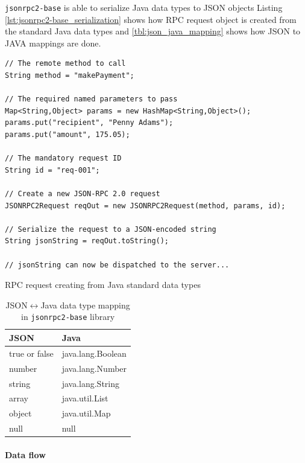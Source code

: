 \texttt{jsonrpc2-base} is able to serialize Java data types to JSON objects
Listing \ref{lst:jsonrpc2-base_serialization} shows how RPC request object is
created from the standard Java data types and \autoref{tbl:json_java_mapping}
shows how JSON to JAVA mappings are done.

\begin{listing}[H]
\begin{verbatim}
// The remote method to call
String method = "makePayment";

// The required named parameters to pass
Map<String,Object> params = new HashMap<String,Object>();
params.put("recipient", "Penny Adams");
params.put("amount", 175.05);

// The mandatory request ID
String id = "req-001";

// Create a new JSON-RPC 2.0 request
JSONRPC2Request reqOut = new JSONRPC2Request(method, params, id);

// Serialize the request to a JSON-encoded string
String jsonString = reqOut.toString();

// jsonString can now be dispatched to the server...
\end{verbatim}
\caption{RPC request creating from Java standard data types \cite{jsonrpc2-base}}
\label{lst:jsonrpc2-base_serialization}
\end{listing}


\begin{table}[h]
	\centering	
	\begin{tabularx}{0.5\textwidth}{|X|X|}
		\hline
		\textbf{JSON} & \textbf{Java} 	 	\\ \hline	    
		true or false & java.lang.Boolean 	\\ \hline	    
		number & java.lang.Number		 	\\ \hline
	   	string & java.lang.String		 	\\ \hline		
		array & java.util.List		 	\\ \hline
		object & java.util.Map			 	\\ \hline
		null & null		 	\\ \hline			  
	\end{tabularx} 
	\caption{{JSON}\(\leftrightarrow\){Java} data type mapping in
	\texttt{jsonrpc2-base} library \cite{jsonrpc2-base}}
	\label{tbl:json_java_mapping}
\end{table}

\paragraph{Data flow} ~\\

